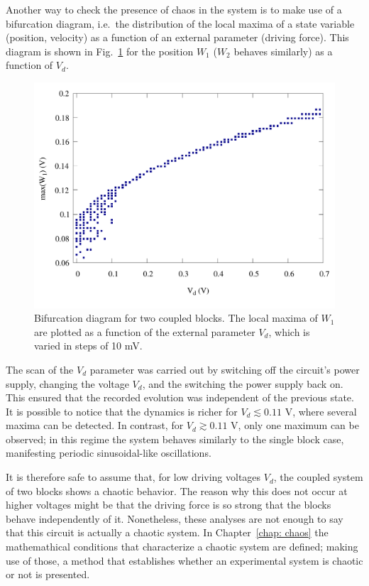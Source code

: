 Another way to check the presence of chaos in the system is to make use of a bifurcation diagram, i.e.\ the distribution
of the local maxima of a state variable (position, velocity) as a function of an external parameter (driving force).
This diagram is shown in Fig.~\ref{fig: bifurcation} for the position $W_1$ ($W_2$ behaves similarly) as a function of $V_d$.

\begin{figure}[!htbp]
    \centering
    \includegraphics[width=0.6\linewidth]{../blocks/2_blocks/bifurcation/bifurcation.pdf}
    \caption{Bifurcation diagram for two coupled blocks.
    The local maxima of $W_1$ are plotted as a function of the external parameter $V_d$,
    which is varied in steps of 10 mV.}\label{fig: bifurcation}
\end{figure}

The scan of the $V_d$ parameter was carried out by switching off the circuit's power supply, changing the voltage $V_d$,
and the switching the power supply back on. This ensured that the recorded evolution was independent of the previous state.
It is possible to notice that the dynamics is richer for $V_d\lesssim0.11$ V, where several maxima can be detected.
In contrast, for $V_d\gtrsim0.11$ V, only one maximum can be observed; in this regime the system behaves similarly
to the single block case, manifesting periodic sinusoidal-like oscillations.

It is therefore safe to assume that, for low driving voltages $V_d$, the coupled system of two blocks shows a chaotic behavior.
The reason why this does not occur at higher voltages might be that the driving force is so strong that the blocks
behave independently of it. Nonetheless, these analyses are not enough to say that this circuit is actually a chaotic system.
In Chapter~\ref{chap: chaos} the mathemathical conditions that characterize
a chaotic system are defined; making use of those, a method that establishes whether an experimental
system is chaotic or not is presented.




